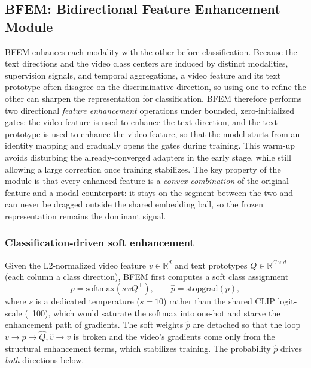 \subsection{BFEM: Bidirectional Feature Enhancement Module}
\label{sec:bgsa}
BFEM enhances each modality with the other before classification.
Because the text directions and the video class centers are induced by distinct modalities, supervision signals, and temporal aggregations, a video feature and its text prototype often disagree on the discriminative direction, so using one to refine the other can sharpen the representation for classification.
BFEM therefore performs two directional \emph{feature enhancement} operations under bounded, zero-initialized gates: the video feature is used to enhance the text direction, and the text prototype is used to enhance the video feature, so that the model starts from an identity mapping and gradually opens the gates during training.
This warm-up avoids disturbing the already-converged adapters in the early stage, while still allowing a large correction once training stabilizes.
The key property of the module is that every enhanced feature is a \emph{convex combination} of the original feature and a modal counterpart: it stays on the segment between the two and can never be dragged outside the shared embedding ball, so the frozen representation remains the dominant signal.

\subsubsection{Classification-driven soft enhancement}
Given the L2-normalized video feature $v \in \mathbb{R}^{d}$ and text prototypes $Q \in \mathbb{R}^{C \times d}$ (each column a class direction), BFEM first computes a soft class assignment
\begin{equation}
  p = \mathrm{softmax}\!\left( s \, v Q^\top \right), \qquad \hat{p} = \mathrm{stopgrad}(p),
  \label{eq:bgsa-p}
\end{equation}
where $s$ is a dedicated temperature ($s = 10$) rather than the shared CLIP logit-scale (~100), which would saturate the softmax into one-hot and starve the enhancement path of gradients.
The soft weights $\hat{p}$ are detached so that the loop $v \rightarrow p \rightarrow \hat{Q}, \hat{v} \rightarrow v$ is broken and the video's gradients come only from the structural enhancement terms, which stabilizes training.
The probability $\hat{p}$ drives \emph{both} directions below.

